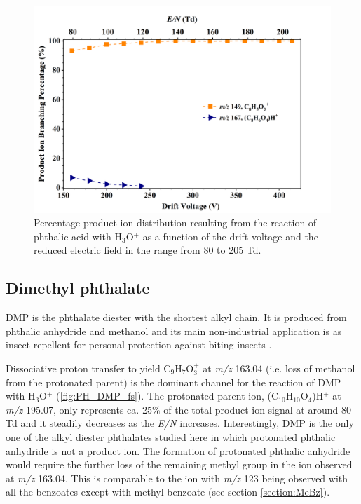 

\begin{figure}[htbp]
\centering
\includegraphics[height=0.4\textheight]{pics/Pacid-BR.png}
\caption{Percentage product ion distribution resulting from the reaction of phthalic acid with H$_3$O$^+$ as a function of the drift voltage and the reduced electric field in the range from 80 to 205 Td.}
\label{fig:PH_PAcid}
\end{figure}



\subsection{Dimethyl phthalate}
DMP is the phthalate diester with the shortest alkyl chain. It is produced from phthalic anhydride and methanol \cite{lowenheim1975industrial} and  its main non-industrial application is as insect repellent for personal protection against biting insects  \cite{o2013merck,brown1997insect}.


Dissociative proton transfer to yield C$_9$H$_{7}$O$_3^+$ at \textit{m/z} 163.04 (i.e. loss of methanol from the protonated parent)
is the dominant channel for the reaction of DMP with H$_3$O$^+$ (\autoref{fig:PH_DMP_fs}).
The protonated parent ion, (C$_{10}$H$_{10}$O$_4$)H$^+$ at \textit{m/z} 195.07, only represents ca. 25\% of the total product ion signal at around 80 Td and it steadily decreases as the \textit{E/N} increases.
%
Interestingly, DMP is the only one of the alkyl diester phthalates studied here in which protonated phthalic anhydride is not a product ion. The formation of protonated phthalic anhydride would require the further loss of the remaining methyl group in the ion observed at \textit{m/z} 163.04.
%
This is comparable to the ion with \textit{m/z} 123 being observed with all the benzoates except with methyl benzoate (see section \ref{section:MeBz}). 



